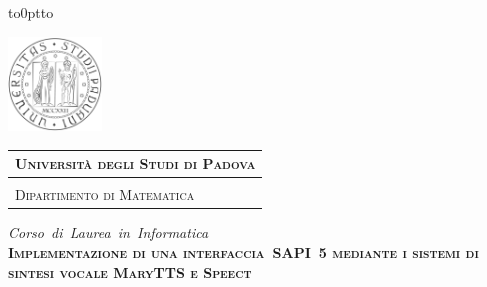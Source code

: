 \documentclass[a4paper, 12pt, twoside, openright]{book}
\begin{document}
\frontmatter

\begin{titlepage} %
\begin{center}
\vbox to0pt{\vbox to\vss}

\hspace{0.5cm}
\begin{minipage}{.20\textwidth}
  \includegraphics[height=2.5cm]{images/unipd-bn}
\end{minipage}\begin{minipage}{.90\textwidth}
  \begin{table}[H]
  \begin{tabular}{l}
  \scshape{\Large{\bfseries{Università degli Studi di Padova}}} \\
  \hline \\
  \scshape{\Large{Dipartimento di Matematica}} \\
  \end{tabular}
  \end{table}
\end{minipage}

\vspace{1cm}
\emph{\Large{Corso~di~Laurea~in~Informatica}} \\
\vspace{1.5cm}
\scshape{\Large{\bfseries{Implementazione di una interfaccia~SAPI~5 mediante i sistemi di sintesi vocale MaryTTS e Speect}}} \\
\end{center}


\end{titlepage}
\end{document}
